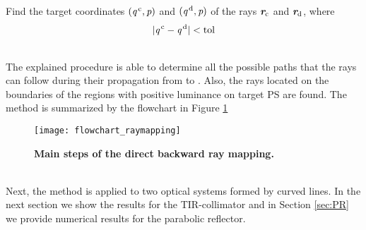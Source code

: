\begin{algorithm}
\begin{algorithmic}[1]
\State Find the target coordinates $(\textit{q}^{\,\textrm{c}},\textit{p})$ and $(\textit{q}^{\,\textrm{d}},\textit{p})$ of the rays $\textit{\textbf{r}}_{\textrm{c}}$ and $\textit{\textbf{r}}_{\textrm{d}}$, where $$|\textit{q}^{\,\textrm{c}}-\textit{q}^{\,\textrm{d}}|<\textrm{tol}$$
\If {$\lineaj\neq \nline$}
\State{}
\EndIf 
\State{}
\EndIf
\EndProcedure
\end{algorithmic}
\end{algorithm}
\\ \indent The explained procedure is able to determine all the possible paths that the rays can follow during their propagation from  to . Also, the rays located on the boundaries of the regions with positive luminance on target PS  are found.
The method is summarized by the flowchart in Figure \ref{fig:flowchart_raymapping}
\begin{figure}[t]
  \begin{center}
  \texttt{[image: flowchart\_raymapping]}
  \end{center}
  \caption{\textbf{Main steps of the direct backward ray mapping.}}
\label{fig:flowchart_raymapping}
 \end{figure}
\\ \indent
Next, the method is applied to two optical systems formed by curved lines. In the next section we show the results for the TIR-collimator and in Section \ref{sec:PR} we provide numerical results for the parabolic reflector.
